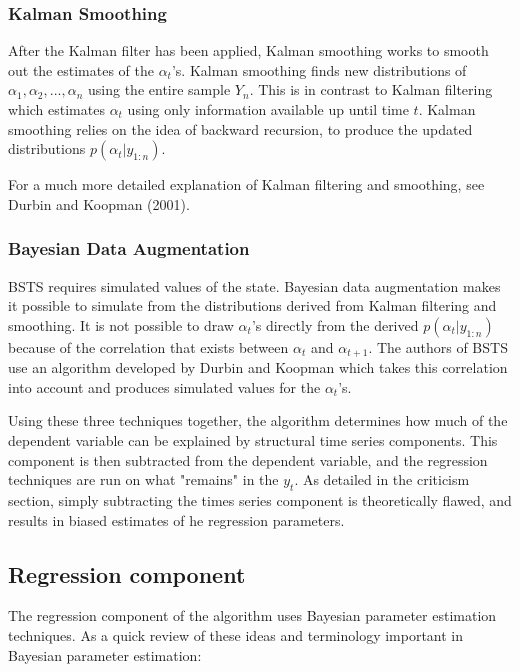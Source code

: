 \documentclass[11pt, oneside]{book}   	%
\begin{document}
 \subsubsection{Kalman Smoothing}
 
After the Kalman filter has been applied, Kalman smoothing works to smooth out the estimates of the $\alpha_{t}$'s.  Kalman smoothing finds new distributions of $\alpha_{1}, \alpha_{2},..., \alpha_{n}$ using the entire sample $Y_{n}$.  This is in contrast to Kalman filtering which estimates $\alpha_{t}$ using only information available up until time $t$. Kalman smoothing relies on the idea of backward recursion, to produce the updated distributions $p(\alpha_{t} | y_{1:n})$.

For a much more detailed explanation of Kalman filtering and smoothing, see Durbin and Koopman (2001). 

\subsubsection{Bayesian Data Augmentation}

BSTS requires simulated values of the state. Bayesian data augmentation makes it possible to simulate from the distributions derived from Kalman filtering and smoothing. It is not possible to draw $\alpha_{t}$'s directly from the derived $p(\alpha_{t} | y_{1:n})$ because of the correlation that exists between $\alpha_{t}$ and $\alpha_{t+1}$. The authors of BSTS use an algorithm developed by Durbin and Koopman which takes this correlation into account and produces simulated values for the $\alpha_{t}$'s. 
 
 
Using these three techniques together, the algorithm determines how much of the dependent variable  can be explained by structural time series components. This component is then subtracted from the dependent variable, and the regression techniques are run on what "remains" in the $y_{t}$. As detailed in the criticism section, simply subtracting the times series component is theoretically flawed, and results in biased estimates of he regression parameters. 


\subsection{Regression component}

The regression component of the algorithm uses Bayesian parameter estimation techniques. As a quick review of these ideas and terminology important in Bayesian parameter estimation:
\end{document}
